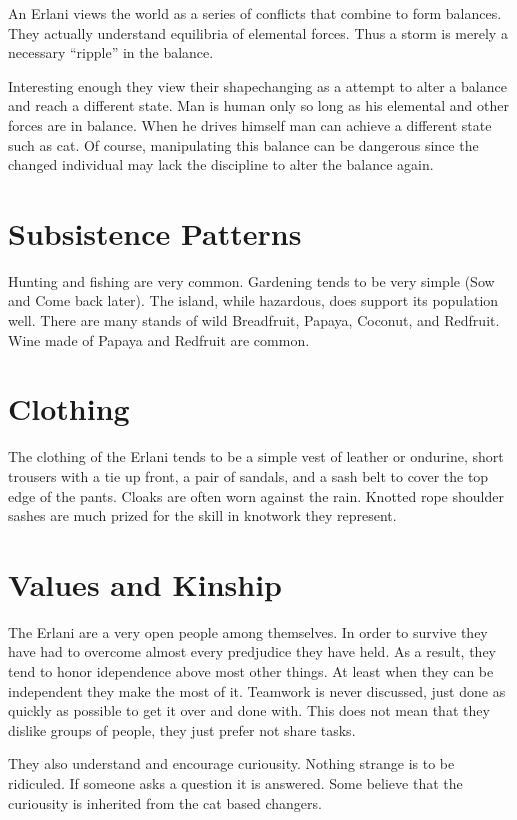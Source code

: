 An Erlani views the world as a series of conflicts that combine to form
balances. They actually understand equilibria of elemental forces. Thus a 
storm is merely a necessary ``ripple'' in the balance. 

Interesting enough they view their shapechanging as a attempt to
alter a balance and reach a different state. Man is human only so 
long as his elemental and other forces are in balance. When he drives
himself man can achieve a different state such as cat. Of course,
manipulating this balance can be dangerous since the changed individual may
lack the discipline to alter the balance again. 

\section{Subsistence Patterns}

Hunting and fishing are very common. Gardening tends to be very
simple (Sow and Come back later). The island, while hazardous, does
support its population well. There are many stands of wild Breadfruit, 
Papaya, Coconut, and Redfruit. Wine made of Papaya and Redfruit are common.

\section{Clothing}

The clothing of the Erlani tends to be a simple vest of leather or 
ondurine, short trousers with a tie up front, a pair of sandals, and
a sash belt to cover the top edge of the pants. Cloaks are often  worn against
the rain. Knotted rope shoulder sashes are much prized for the skill in
knotwork they represent.

\section{Values and Kinship}

The Erlani are a very open people among themselves. In order to survive
they have had to overcome almost every predjudice they have held. As a
result, they tend to honor idependence above most other things. At
least when they can be independent they make the most of it. Teamwork is
never discussed, just done as quickly as possible to get it over and
done with. This does not mean that they dislike groups of people, they
just prefer not share tasks.

They also understand and encourage curiousity. Nothing strange is to
be ridiculed. If someone asks a question it is answered. Some believe
that the curiousity is inherited from the cat based changers.

